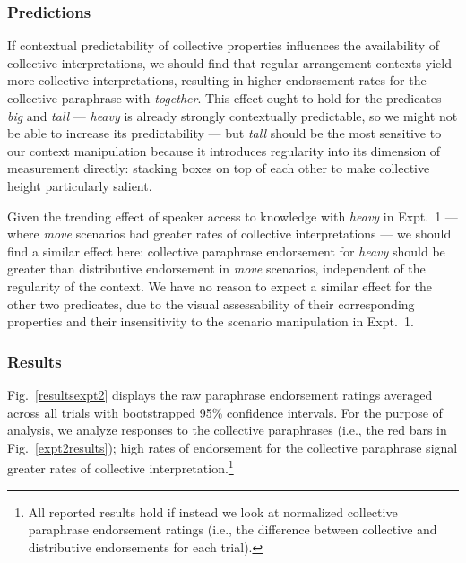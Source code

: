\documentclass[linguex]{sp}
\begin{document}
\subsubsection{Predictions}

If contextual predictability of collective properties influences the availability of collective interpretations, we should find that regular arrangement contexts yield more collective interpretations, resulting in higher endorsement rates for the collective paraphrase with \emph{together}. This effect ought to hold for the predicates \emph{big} and \emph{tall} --- \emph{heavy} is already strongly contextually predictable, so we might not be able to increase its predictability --- but \emph{tall} should be the most sensitive to our context manipulation because it introduces regularity into its dimension of measurement directly: stacking boxes on top of each other to make collective height particularly salient.

Given the trending effect of speaker access to knowledge with \emph{heavy} in Expt.~1 --- where \emph{move} scenarios had greater rates of collective interpretations --- we should find a similar effect here: collective paraphrase endorsement for \emph{heavy} should be greater than distributive endorsement in \emph{move} scenarios, independent of the regularity of the context. We have no reason to expect a similar effect for the other two predicates, due to the visual assessability of their corresponding properties and their insensitivity to the scenario manipulation in Expt.~1.

\subsubsection{Results}

Fig.\ \ref{resultsexpt2} displays the raw paraphrase endorsement ratings averaged across all trials with bootstrapped 95\% confidence intervals. For the purpose of analysis, we analyze responses to the collective paraphrases (i.e., the red bars in Fig.~\ref{expt2results}); high rates of endorsement for the collective paraphrase signal greater rates of collective interpretation.\footnote{All reported results hold if instead we look at normalized collective paraphrase endorsement ratings (i.e., the difference between collective and distributive endorsements for each trial).} %
\end{document}
